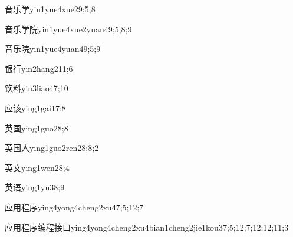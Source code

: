 \begin{verbete}{音乐学}{yin1yue4xue2}{9;5;8}
\end{verbete}

\begin{verbete}{音乐学院}{yin1yue4xue2yuan4}{9;5;8;9}
\end{verbete}

\begin{verbete}{音乐院}{yin1yue4yuan4}{9;5;9}
\end{verbete}

\begin{verbete}{银行}{yin2hang2}{11;6}
\end{verbete}

\begin{verbete}{饮料}{yin3liao4}{7;10}
\end{verbete}

\begin{verbete}{应该}{ying1gai1}{7;8}
\end{verbete}

\begin{verbete}{英国}{ying1guo2}{8;8}
\end{verbete}

\begin{verbete}{英国人}{ying1guo2ren2}{8;8;2}
\end{verbete}

\begin{verbete}{英文}{ying1wen2}{8;4}
\end{verbete}

\begin{verbete}{英语}{ying1yu3}{8;9}
\end{verbete}

\begin{verbete}{应用程序}{ying4yong4cheng2xu4}{7;5;12;7}
\end{verbete}

\begin{verbete*}{应用程序编程接口}{ying4yong4cheng2xu4bian1cheng2jie1kou3}{7;5;12;7;12;12;11;3}
\end{verbete*}


